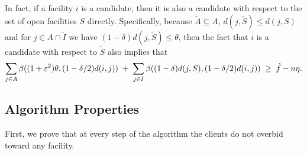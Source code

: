 In fact, if a facility $i$ is a candidate, then it is also a candidate with respect to the set of open facilities $S$ directly.
Specifically, because $\tilde A \subseteq A$, $d(j, \tilde S) \leq d(j,S)$ and for $j \in A \cap \tilde I$ we have $(1-\delta)d(j,\tilde S) \leq \theta$, then the fact that $i$ is a candidate with respect to $\tilde S$ also implies that
\begin{align*}
    \sum_{j\in A}\beta((1+\varepsilon^2) \theta, (1- \delta/2)d(i,j))
    \;+\;
    \sum_{j\in I}\beta((1-\delta)d(j,S), (1-\delta/2)d(i,j))
    \;\ge\; \hat f - n \eta.
\end{align*}

\subsection{Algorithm Properties}

First, we prove that at every step of the algorithm the clients do not overbid toward any facility.

